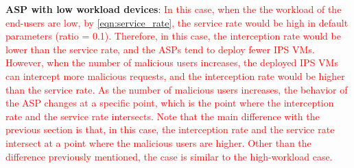 \documentclass[10pt,journal, compsoc]{IEEEtran}
\begin{document}


\textbf{ASP with low workload devices}: \textcolor{red}{In this case, when the the workload of the end-users are low, by \cref{eqn:service_rate}, the service rate would be high in default parameters (ratio = 0.1). Therefore, in this case, the interception rate would be lower than the service rate, and the ASPs tend to deploy fewer IPS VMs. However, when the number of malicious users increases, the deployed IPS VMs can intercept more malicious requests, and the interception rate would be higher than the service rate. As the number of malicious users increases, the behavior of the ASP changes at a specific point, which is the point where the interception rate and the service rate intersects. Note that the main difference with the previous section is that, in this case, the interception rate and the service rate intersect at a point where the malicious users are higher. Other than the difference previously mentioned, the case is similar to the high-workload case.} 


\end{document}
